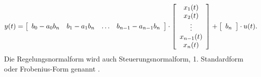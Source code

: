 \begin{equation*}
y(t) = 
\left [ 
\begin{array}{c c c c}
b_0-a_0b_n & b_1-a_1b_n & \ldots & b_{n-1}-a_{n-1}b_n\\
\end{array}
\right ] \cdot
\left [ 
\begin{array}{c}
x_1(t)\\
x_2(t)\\
\vdots \\
x_{n-1}(t)\\
x_{n}(t)\\
\end{array}
\right ]+
\left [ 
\begin{array}{c}
b_n \\
\end{array}
\right ] \cdot
u(t).
\end{equation*}
\nit Die Regelungsnormalform wird auch Steuerungsnormalform, 1. Standardform oder Frobenius-Form genannt \cite{LUT:WEN:05}.

\newpage
